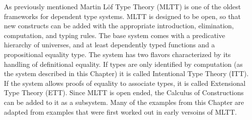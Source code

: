 As previously mentioned Martin L{\"o}f Type Theory (\ac{MLTT})\cite{Martin-Lof-1972} is one of the oldest frameworks for dependent type systems.
MLTT is designed to be open, so that new constructs can be added with the appropriate introduction, elimination, computation, and typing rules.
The base system comes with a predicative hierarchy of universes, and at least dependently typed functions and a propositional equality type.
The system has two flavors characterized by its handling of definitional equality.
If types are only identified by computation (as the system described in this Chapter) it is called Intentional Type Theory (\ac{ITT}).
If the system allows proofs of equality to associate types, it is called Extensional Type Theory (\ac{ETT}).
Since \ac{MLTT} is open ended, the Calculus of Constructions can be added to it as a subsystem\cite{aspinall2004dependent,hofmann1997extensional}.
Many of the examples from this Chapter are adapted from examples that were first worked out in early versoins of \ac{MLTT}.
 
 
 

